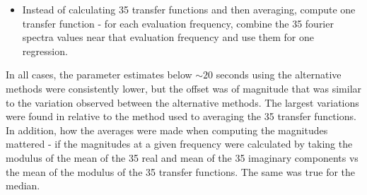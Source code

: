 \documentclass[draft,linenumbers]{agujournal2018}
\begin{document}
\begin{itemize}
\item Instead of calculating 35 transfer functions and then averaging, compute one transfer function - for each evaluation frequency, combine the 35 fourier spectra values near that evaluation frequency and use them for one regression.  
\end{itemize}

In all cases, the parameter estimates below $\sim 20$ seconds using the alternative methods were consistently lower, but the offset was of magnitude that was similar to the variation observed between the alternative methods. The largest variations were found in relative to the method used to averaging the 35 transfer functions. In addition, how the averages were made when computing the magnitudes mattered - if the magnitudes at a given frequency were calculated by taking the modulus of the mean of the 35 real and mean of the 35 imaginary components vs the mean of the modulus of the 35 transfer functions. The same was true for the median.




\end{document}
